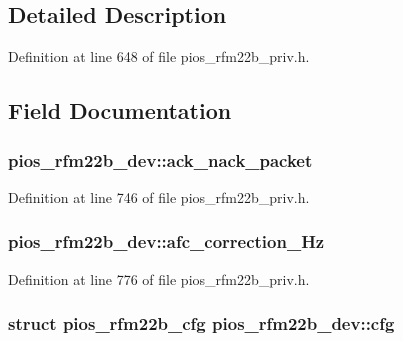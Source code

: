 \subsection{Detailed Description}


Definition at line 648 of file pios\-\_\-rfm22b\-\_\-priv.\-h.



\subsection{Field Documentation}
\hypertarget{structpios__rfm22b__dev_a57f8d0ab5171f50e634940b11cc402c1}{
\subsubsection[{ack\-\_\-nack\-\_\-packet}]{ pios\-\_\-rfm22b\-\_\-dev\-::ack\-\_\-nack\-\_\-packet}}\label{structpios__rfm22b__dev_a57f8d0ab5171f50e634940b11cc402c1}


Definition at line 746 of file pios\-\_\-rfm22b\-\_\-priv.\-h.

\hypertarget{structpios__rfm22b__dev_a7ee3ea27898cb9341fcbfe9d4b7ad874}{
\subsubsection[{afc\-\_\-correction\-\_\-\-Hz}]{ pios\-\_\-rfm22b\-\_\-dev\-::afc\-\_\-correction\-\_\-\-Hz}}\label{structpios__rfm22b__dev_a7ee3ea27898cb9341fcbfe9d4b7ad874}


Definition at line 776 of file pios\-\_\-rfm22b\-\_\-priv.\-h.

\hypertarget{structpios__rfm22b__dev_a2fc3047fbb17be7e546cab4e24ee2b28}{
\subsubsection[{cfg}]{\setlength{\rightskip}{0pt plus 5cm}struct {\bf pios\-\_\-rfm22b\-\_\-cfg} pios\-\_\-rfm22b\-\_\-dev\-::cfg}}\label{structpios__rfm22b__dev_a2fc3047fbb17be7e546cab4e24ee2b28}


